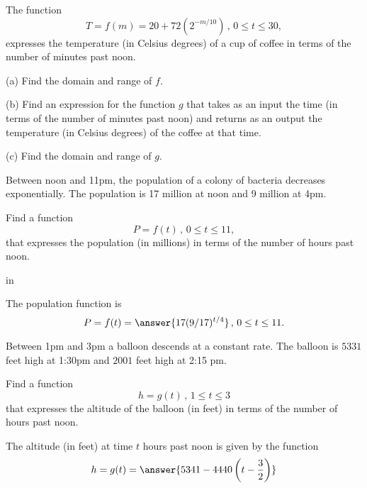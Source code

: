 \documentclass{ximera}
\newcommand{\pskip}{\vskip 0.1 in}
\begin{document}
\begin{question}  \label{QDFdf4444}
The function
\[
      T = f(m) = 20 + 72 (2^{-m/10}) \, , \, 0 \leq t \leq 30 ,
\]
expresses the temperature (in Celsius degrees) of a cup of coffee in terms of the number of minutes past noon.

(a) Find the domain and range of $f$.

(b) Find an expression for the function $g$ that takes as an input the time (in terms of the number of minutes past noon) and returns as an output the temperature (in Celsius degrees) of the coffee at that time.

(c) Find the domain and range of $g$.

\end{question}

\begin{question}  \label{Q87d6fgte}
Between noon and 11pm, the population of a colony of bacteria decreases exponentially. The population is 17 million at noon and 9 million at 4pm.

Find a function
\[
        P = f(t) \, , \, 0\leq t \leq 11 ,
\]
that expresses the population (in millions) in terms of the number of hours past noon.

\pskip

The population function is
\[
    P = f(t) = \answer{17(9/17)^{t/4}} \, , \, 0\leq t \leq 11 .
\]
\end{question}


\begin{question}  \label{Q98d33dg5r5r3}
Between 1pm and 3pm a balloon descends at a constant rate. The balloon is $5331$ feet high at 1:30pm and $2001$ feet high at 2:15 pm.

Find a function
\[
      h = g(t) \, , \, 1\leq t \leq 3
\]
that expresses the altitude of the balloon (in feet) in terms of the number of hours past noon.
\end{question}

The altitude (in feet) at time $t$ hours past noon is given by the function
\[
  h = g(t) = \answer{5341 - 4440  \left(t - \frac{3}{2}   \right)}
\]
\end{document}
